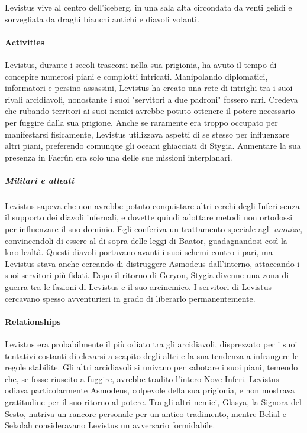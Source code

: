\documentclass{article}
\begin{document}
            Levistus vive al centro dell'iceberg, in una sala alta circondata da venti gelidi e sorvegliata da draghi bianchi antichi e diavoli volanti.
            \paragraph{Activities}
Levistus, durante i secoli trascorsi nella sua prigionia, ha avuto il tempo di concepire numerosi piani e complotti intricati. Manipolando diplomatici, informatori e persino assassini, Levistus ha creato una rete di intrighi tra i suoi rivali arcidiavoli, nonostante i suoi "servitori a due padroni" fossero rari. Credeva che rubando territori ai suoi nemici avrebbe potuto ottenere il potere necessario per fuggire dalla sua prigione. Anche se raramente era troppo occupato per manifestarsi fisicamente, Levistus utilizzava aspetti di se stesso per influenzare altri piani, preferendo comunque gli oceani ghiacciati di Stygia. Aumentare la sua presenza in Faerûn era solo una delle sue missioni interplanari.

\subparagraph{Militari e alleati}
Levistus sapeva che non avrebbe potuto conquistare altri cerchi degli Inferi senza il supporto dei diavoli infernali, e dovette quindi adottare metodi non ortodossi per influenzare il suo dominio. Egli conferiva un trattamento speciale agli \textit{amnizu}, convincendoli di essere al di sopra delle leggi di Baator, guadagnandosi così la loro lealtà. Questi diavoli portavano avanti i suoi schemi contro i pari, ma Levistus stava anche cercando di distruggere Asmodeus dall'interno, attaccando i suoi servitori più fidati. Dopo il ritorno di Geryon, Stygia divenne una zona di guerra tra le fazioni di Levistus e il suo arcinemico. I servitori di Levistus cercavano spesso avventurieri in grado di liberarlo permanentemente.

\paragraph{Relationships}
Levistus era probabilmente il più odiato tra gli arcidiavoli, disprezzato per i suoi tentativi costanti di elevarsi a scapito degli altri e la sua tendenza a infrangere le regole stabilite. Gli altri arcidiavoli si univano per sabotare i suoi piani, temendo che, se fosse riuscito a fuggire, avrebbe tradito l'intero Nove Inferi. Levistus odiava particolarmente Asmodeus, colpevole della sua prigionia, e non mostrava gratitudine per il suo ritorno al potere. Tra gli altri nemici, Glasya, la Signora del Sesto, nutriva un rancore personale per un antico tradimento, mentre Belial e Sekolah consideravano Levistus un avversario formidabile.
\end{document}
